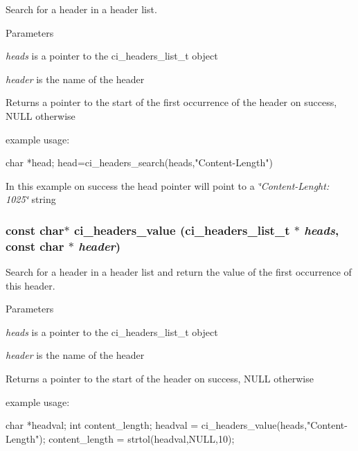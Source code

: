 Search for a header in a header list. 
\begin{DoxyParams}{Parameters}
\item[{\em heads}]is a pointer to the ci\_\-headers\_\-list\_\-t object \item[{\em header}]is the name of the header \end{DoxyParams}
\begin{DoxyReturn}{Returns}
a pointer to the start of the first occurrence of the header on success, NULL otherwise
\end{DoxyReturn}
example usage: 
\begin{DoxyCode}
 char *head;
 head=ci_headers_search(heads,"Content-Length")
\end{DoxyCode}
 In this example on success the head pointer will point to a {\itshape \char`\"{}Content-\/Lenght: 1025\char`\"{}\/} string \hypertarget{group__HEADERS_ga6a862010fd4c98f189e2671291bac42a}{
\subsubsection[{ci\_\-headers\_\-value}]{\setlength{\rightskip}{0pt plus 5cm}const char$\ast$ ci\_\-headers\_\-value ({\bf ci\_\-headers\_\-list\_\-t} $\ast$ {\em heads}, \/  const char $\ast$ {\em header})}}
\label{group__HEADERS_ga6a862010fd4c98f189e2671291bac42a}


Search for a header in a header list and return the value of the first occurrence of this header. 
\begin{DoxyParams}{Parameters}
\item[{\em heads}]is a pointer to the ci\_\-headers\_\-list\_\-t object \item[{\em header}]is the name of the header \end{DoxyParams}
\begin{DoxyReturn}{Returns}
a pointer to the start of the header on success, NULL otherwise
\end{DoxyReturn}
example usage: 
\begin{DoxyCode}
 char *headval;
 int content_length;
 headval = ci_headers_value(heads,"Content-Length");
 content_length = strtol(headval,NULL,10);
\end{DoxyCode}
 
